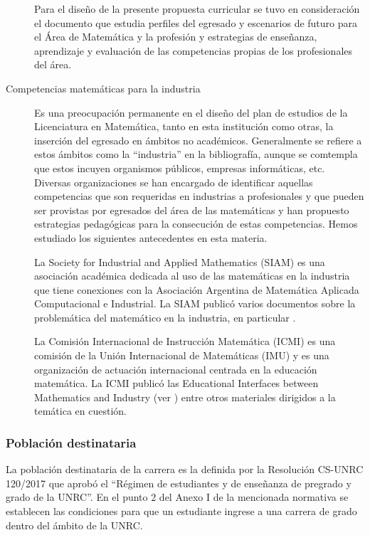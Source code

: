 \documentclass[a4paper, 12pt]{article}
\begin{document}
\begin{description}
Para el diseño de la presente propuesta curricular se tuvo en consideración el documento \cite{paniagua2013educacion} 
que estudia perfiles del egresado y escenarios de futuro para el Área de Matemática y la profesión y estrategias de enseñanza, aprendizaje y evaluación de las competencias propias de los profesionales del área. 

\item[Competencias matemáticas para la industria] 
Es una preocupación permanente en el diseño del plan de estudios de la Licenciatura en Matemática, tanto en esta institución como otras, la inserción del egresado en ámbitos no académicos. Generalmente se refiere a estos ámbitos como la ``industria'' en la bibliografía, aunque se comtempla que estos incuyen organismos públicos, empresas informáticas, etc. Diversas organizaciones se han encargado de identificar aquellas competencias que son requeridas en industrias a profesionales y que pueden ser provistas por egresados del área de las matemáticas y han propuesto estrategias pedagógicas para la consecución de estas competencias. Hemos estudiado los siguientes antecedentes en esta materia.

La Society for Industrial and Applied Mathematics (SIAM)  es una asociación académica dedicada al uso de las matemáticas en la industria que tiene conexiones con la Asociación Argentina de Matemática Aplicada Computacional e Industrial. La SIAM publicó varios documentos sobre la problemática del matemático en la industria, en particular \cite{society1996siam,society2012siam}.


 La Comisión Internacional de Instrucción Matemática (ICMI) es una comisión de la Unión Internacional de Matemáticas (IMU) y es una organización de actuación internacional centrada en la educación matemática. La ICMI publicó las Educational Interfaces between Mathematics and Industry (ver \cite{damlamian2013educational}) entre otros materiales dirigidos a la temática en cuestión.
\end{description}



\subsubsection{Población destinataria}

La población destinataria de la carrera es la definida por la Resolución CS-UNRC 120/2017 que aprobó el ``Régimen  de estudiantes y de enseñanza de pregrado y grado de la UNRC''. En el punto 2 del Anexo I de la mencionada normativa se establecen las condiciones para que un estudiante ingrese a una carrera de grado dentro del ámbito de la UNRC.
\end{document}
